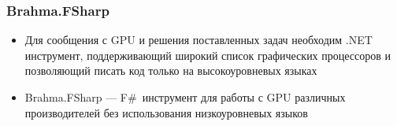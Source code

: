 \documentclass[aspectratio=169]{beamer}
\begin{document}

\begin{frame}
  \frametitle{Brahma.FSharp}
    \begin{itemize}
        \item Для сообщения с GPU и решения поставленных задач  необходим .NET инструмент, поддерживающий широкий список графических процессоров и позволяющий писать код только на высокоуровневых языках
        \item  Brahma.FSharp --- F\#~инструмент для работы с GPU различных производителей без использования низкоуровневых языков
    \end{itemize}
\end{frame}
\end{document}
